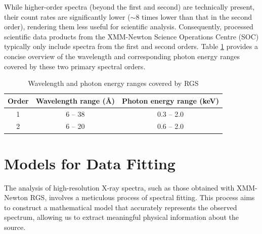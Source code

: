 			While higher-order spectra (beyond the first and second) are technically present, their count rates are significantly lower ($\sim 8$ times lower than that in the second order), rendering them less useful for scientific analysis. Consequently, processed scientific data products from the XMM-Newton Science Operations Centre (SOC) typically only include spectra from the first and second orders. Table \ref{xmm-rgs-wavelength} provides a concise overview of the wavelength and corresponding photon energy ranges covered by these two primary spectral orders.
			\begin{table}[!htb]
				\centering
				\caption{Wavelength and photon energy ranges covered by RGS}
				\label{xmm-rgs-wavelength}
				\begin{tabular}{ccc}
					\hline
					{\textbf{Order}} & {\textbf{Wavelength range (\AA)}} & {\textbf{Photon energy range (keV)}} \\
					\hline
					{1} & {6 -- 38} & {0.3 -- 2.0} \\
					{2} & {6 -- 20} & {0.6 -- 2.0} \\
					\hline
				\end{tabular}
			\end{table}
	
	\section{Models for Data Fitting} \label{hi-resolution:models}
		The analysis of high-resolution X-ray spectra, such as those obtained with XMM-Newton RGS, involves a meticulous process of spectral fitting. This process aims to construct a mathematical model that accurately represents the observed spectrum, allowing us to extract meaningful physical information about the source.
		
